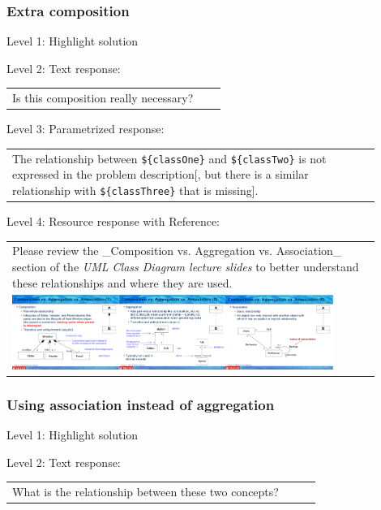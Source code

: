 \subsubsection{Extra composition}

\noindent Level 1: Highlight solution \medskip

\noindent Level 2: Text response: \medskip

\begin{tabular}{|p{0.9\linewidth}}
Is this composition really necessary?
\end{tabular} \medskip

\noindent Level 3: Parametrized response: \medskip

\begin{tabular}{|p{0.9\linewidth}}
The relationship between \verb|${classOne}| and \verb|${classTwo}| is not expressed in the problem description[, but there is a similar relationship with \verb|${classThree}| that is missing].
\end{tabular} \medskip

\noindent Level 4: Resource response with Reference: \medskip

\begin{tabular}{|p{0.9\linewidth}}
Please review the _Composition vs. Aggregation vs. Association_ section of 
the \textit{UML Class Diagram lecture slides} to 
better understand these relationships and where they are used.

\\
\includegraphics[width=0.9\textwidth]{images/composition_aggregation_association.png}
\end{tabular} \medskip


\subsubsection{Using association instead of aggregation}

\noindent Level 1: Highlight solution \medskip

\noindent Level 2: Text response: \medskip

\begin{tabular}{|p{0.9\linewidth}}
What is the relationship between these two concepts?
\end{tabular} \medskip

